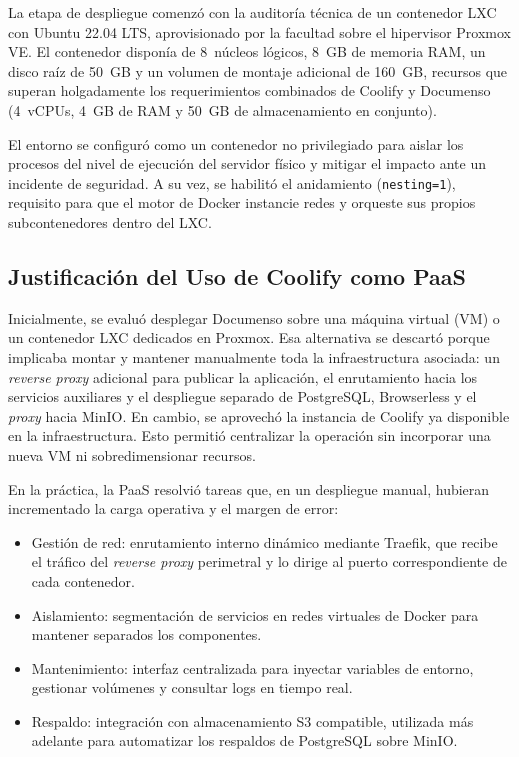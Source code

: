 La etapa de despliegue comenzó con la auditoría técnica de un contenedor LXC con Ubuntu 22.04 LTS, aprovisionado por la facultad sobre el hipervisor Proxmox VE. El contenedor disponía de 8~núcleos lógicos, 8~GB de memoria RAM, un disco raíz de 50~GB y un volumen de montaje adicional de 160~GB, recursos que superan holgadamente los requerimientos combinados de Coolify \cite{coolify_reqs} y Documenso \cite{documenso_reqs} (4~vCPUs, 4~GB de RAM y 50~GB de almacenamiento en conjunto).

El entorno se configuró como un contenedor no privilegiado para aislar los procesos del nivel de ejecución del servidor físico y mitigar el impacto ante un incidente de seguridad. A su vez, se habilitó el anidamiento (\texttt{nesting=1}), requisito para que el motor de Docker instancie redes y orqueste sus propios subcontenedores dentro del LXC.

\subsection{Justificación del Uso de Coolify como PaaS}

Inicialmente, se evaluó desplegar Documenso sobre una máquina virtual (VM) o un contenedor LXC dedicados en Proxmox. Esa alternativa se descartó porque implicaba montar y mantener manualmente toda la infraestructura asociada: un \textit{reverse proxy} adicional para publicar la aplicación, el enrutamiento hacia los servicios auxiliares y el despliegue separado de PostgreSQL, Browserless y el \textit{proxy} hacia MinIO. En cambio, se aprovechó la instancia de Coolify ya disponible en la infraestructura. Esto permitió centralizar la operación sin incorporar una nueva VM ni sobredimensionar recursos.

En la práctica, la PaaS resolvió tareas que, en un despliegue manual, hubieran incrementado la carga operativa y el margen de error:

\begin{itemize}
    \item Gestión de red: enrutamiento interno dinámico mediante Traefik, que recibe el tráfico del \textit{reverse proxy} perimetral y lo dirige al puerto correspondiente de cada contenedor.
    \item Aislamiento: segmentación de servicios en redes virtuales de Docker para mantener separados los componentes.
    \item Mantenimiento: interfaz centralizada para inyectar variables de entorno, gestionar volúmenes y consultar logs en tiempo real.
    \item Respaldo: integración con almacenamiento S3 compatible, utilizada más adelante para automatizar los respaldos de PostgreSQL sobre MinIO.
\end{itemize}

